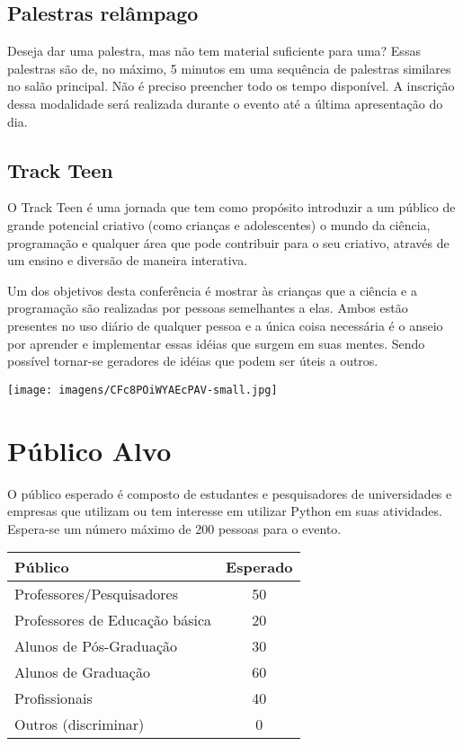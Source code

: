 \documentclass[report,a4paper,twocolumn]{memoir}
\begin{document}
\section*{Palestras relâmpago}

Deseja dar uma palestra, mas não tem material suficiente para uma? Essas palestras são de, no máximo, 5 minutos em uma sequência de palestras similares no salão principal. Não é preciso preencher todo os tempo disponível. A inscrição dessa modalidade será realizada durante o evento até a última apresentação do dia.

\section*{Track Teen}

O Track Teen é uma jornada que tem como propósito introduzir a um público de grande potencial criativo (como crianças e adolescentes) o mundo da ciência, programação e qualquer área que pode contribuir para o seu criativo, através de um ensino e diversão de maneira interativa.

Um dos objetivos desta conferência é mostrar às crianças que a ciência e a programação são realizadas por pessoas semelhantes a elas. Ambos estão presentes no uso diário de qualquer pessoa e a única coisa necessária é o anseio por aprender e implementar essas idéias que surgem em suas mentes. Sendo possível tornar-se geradores de idéias que podem ser úteis a outros.

\begin{center}
\texttt{[image: imagens/CFc8POiWYAEcPAV-small.jpg]}
\end{center}

\chapter*{Público Alvo}

O público esperado é composto de estudantes e pesquisadores de universidades e empresas que utilizam ou tem interesse em utilizar Python em suas atividades. Espera-se um número máximo de 200 pessoas para o evento.

\begin{center}
\begin{tabular}{l c}
\bfseries{Público} & \bfseries{Esperado} \\\toprule
Professores/Pesquisadores & 50\\
Professores de Educação básica & 20\\
Alunos de Pós-Graduação & 30\\
Alunos de Graduação & 60\\
Profissionais & 40\\
Outros (discriminar) & 0\\\bottomrule
\end{tabular}
\end{center}
\end{document}
